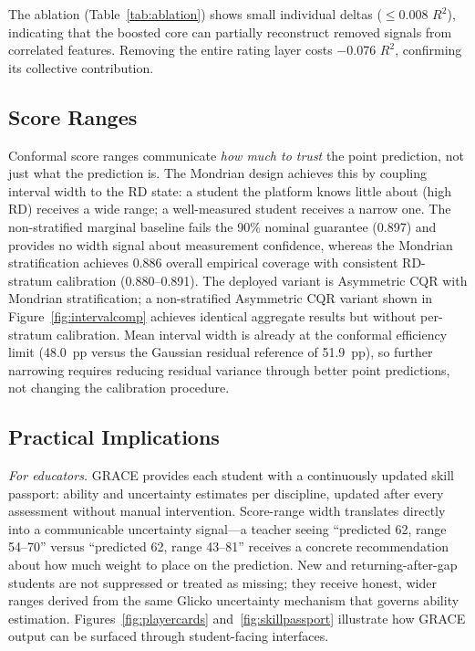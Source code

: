 \documentclass[11pt]{article}
\begin{document}
The ablation (Table~\ref{tab:ablation}) shows small individual deltas ($\le$0.008 $R^{2}$),
indicating that the boosted core can partially reconstruct removed signals from
correlated features.  Removing the entire rating layer costs $-0.076$ $R^{2}$,
confirming its collective contribution.

\subsection{Score Ranges}

Conformal score ranges communicate \emph{how much to trust} the point prediction,
not just what the prediction is.
The Mondrian design achieves this by coupling interval width to the RD state:
a student the platform knows little about (high RD) receives a wide range;
a well-measured student receives a narrow one.
The non-stratified marginal baseline fails the 90\% nominal guarantee (0.897) and
provides no width signal about measurement confidence, whereas the Mondrian
stratification achieves 0.886 overall empirical coverage with consistent RD-stratum calibration (0.880--0.891).
The deployed variant is Asymmetric CQR with Mondrian stratification;
a non-stratified Asymmetric CQR variant shown in Figure~\ref{fig:intervalcomp}
achieves identical aggregate results but without per-stratum calibration.
Mean interval width is already at the conformal efficiency limit (48.0~pp versus the
Gaussian residual reference of 51.9~pp), so further narrowing requires reducing
residual variance through better point predictions, not changing the calibration procedure.

\subsection{Practical Implications}

\textit{For educators.}\quad
GRACE provides each student with a continuously updated skill passport: ability and
uncertainty estimates per discipline, updated after every assessment without manual
intervention.
Score-range width translates directly into a communicable uncertainty signal---a teacher
seeing ``predicted 62, range 54--70'' versus ``predicted 62, range 43--81'' receives a
concrete recommendation about how much weight to place on the prediction.
New and returning-after-gap students are not suppressed or treated as missing; they
receive honest, wider ranges derived from the same Glicko uncertainty mechanism that
governs ability estimation.
Figures~\ref{fig:playercards} and~\ref{fig:skillpassport} illustrate how GRACE output
can be surfaced through student-facing interfaces.
\end{document}
